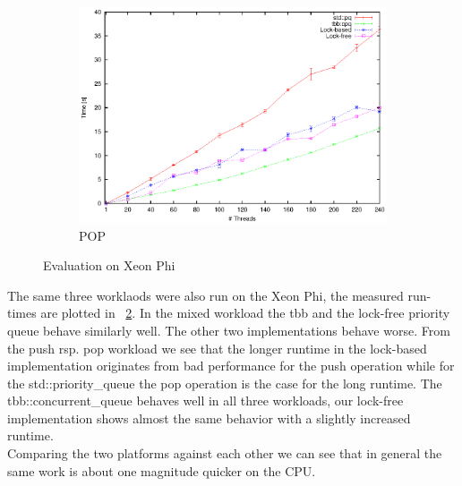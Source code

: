 \begin{figure}[t]
\begin{subfigure}[b]{0.3\textwidth}
		\centering
		\includegraphics[width=\textwidth]{../plots/xp_pop/runtime_pop}
		\caption{POP}
		\label{fig:xp_pop}
	\end{subfigure}
	\caption{Evaluation on Xeon Phi}
	\label{fig:eval_xp}
\end{figure}
The same three worklaods were also run on the Xeon Phi, the measured run-times are plotted in \figurename~\ref{fig:eval_xp}. In the mixed workload the tbb and the lock-free priority queue behave similarly well. The other two implementations behave worse. From the push rsp. pop workload we see that the longer runtime in the lock-based implementation originates from bad performance for the push operation while for the std::priority\_queue the pop operation is the case for the long runtime. The tbb::concurrent\_queue behaves well in all three workloads, our lock-free implementation shows almost the same behavior with a slightly increased runtime.\\

Comparing the two platforms against each other we can see that in general the same work is about one magnitude quicker on the CPU.


